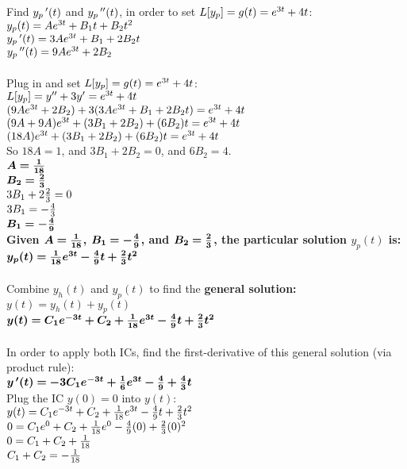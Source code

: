 \documentclass{article}
\begin{document}
\begin{enumerate}
Find $y_p\,\sp{\prime}(t)$ and $y_p\,\sp{\prime\prime}(t)$, in order to set $L[y_p] = g(t) = e\sp{3t} + 4t$:\\
$y_{p}(t) = Ae\sp{3t}+B_1t + B_2t^2$\\
$y_{p}\,\sp{\prime}(t) = 3Ae\sp{3t}+B_1 + 2B_2t$\\
$y_{p}\,\sp{\prime\prime}(t) = 9Ae\sp{3t} + 2B_2$\\\\
Plug in and set $L[y_p] = g(t) = e\sp{3t} + 4t$:\\
$L[y_p] = y''+3y' = e\sp{3t} + 4t$\\
$(9Ae\sp{3t} + 2B_2)+3(3Ae\sp{3t}+B_1 + 2B_2t) = e\sp{3t} + 4t$\\
$(9A+9A)e\sp{3t} + (3B_1 + 2B_2) +  (6B_2)t = e\sp{3t} + 4t$\\
$(18A)e\sp{3t} + (3B_1 + 2B_2) +  (6B_2)t = e\sp{3t} + 4t$\\

So $18A = 1$, and $3B_1 + 2B_2 = 0$,  and $6B_2 = 4$.\\
$\bm{A={1\over18}}$\\
$\bm{B_2 = {2\over3}}$\\

$3B_1 + 2{2\over3} = 0$\\
$3B_1 = -{4\over3}$\\
$\bm{B_1 = -{4\over9}}$\\

\textbf{Given $\bm{A={1\over18}}$, $\bm{B_1 = -{4\over9}}$, and $\bm{B_2 = {2\over3}}$, the particular solution $y_p(t)$ is:}\\
$\bm{y_{p}(t) = {1\over18}e\sp{3t}-{4\over9}t + {2\over3}t^2}$\\\\
Combine $y_h(t)$ and $y_p(t)$ to find the \textbf{general solution:}\\
$y(t) = y_h(t) + y_p(t)$\\
$\bm{y(t) = C_1e\sp{-3t} + C_2 + {1\over18}e\sp{3t}-{4\over9}t + {2\over3}t^2}$\\\\
In order to apply both ICs, find the first-derivative of this general solution (via product rule):\\
$\bm{y\,\sp\prime(t) = -3C_1e\sp{-3t} + {1\over6}e\sp{3t} -{4\over9} + {4\over3}t}$\\

Plug the IC $y(0)=0$ into $y(t)$:\\
$y(t) = C_1e\sp{-3t} + C_2 + {1\over18}e\sp{3t}-{4\over9}t + {2\over3}t^2$\\
$0 = C_1e\sp{0} + C_2 + {1\over18}e\sp{0}-{4\over9}(0) + {2\over3}(0)^2$\\
$0 = C_1 + C_2 + {1\over18}$\\
$C_1 + C_2 = -{1\over18}$\\


\end{enumerate}
\end{document}
